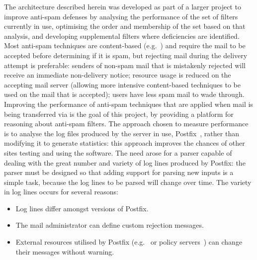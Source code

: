 \documentclass{svmult}
\begin{document}
The architecture described herein was developed as part of a larger project
to improve anti-spam defenses by analysing the performance of the set of
filters currently in use, optimising the order and membership of the set
based on that analysis, and developing supplemental filters where
deficiencies are identified.  Most anti-spam techniques are content-based
(e.g.~\cite{a-plan-for-spam, word-stemming, relaxed-online-svms}) and
require the mail to be accepted before determining if it is spam, but
rejecting mail during the delivery attempt is preferable: senders of
non-spam mail that is mistakenly rejected will receive an immediate
non-delivery notice; resource usage is reduced on the accepting mail server
(allowing more intensive content-based techniques to be used on the mail
that is accepted); users have less spam mail to wade through.  Improving
the performance of anti-spam techniques that are applied when mail is being
transferred via \SMTP{}\footnotemark{} is the goal of this project, by
providing a platform for reasoning about anti-spam filters.  The approach
chosen to measure performance is to analyse the log files produced by the
\SMTP{} server in use, Postfix~\cite{postfix}, rather than modifying it to
generate statistics: this approach improves the chances of other sites
testing and using the software.  The need arose for a parser capable of
dealing with the great number and variety of log lines produced by Postfix:
the parser must be designed so that adding support for parsing new inputs
is a simple task, because the log lines to be parsed will change over time.
The variety in log lines occurs for several reasons:

\begin{itemize}

    \item Log lines differ amongst versions of Postfix.
        
    \item The mail administrator can define custom rejection messages.

    \item External resources utilised by Postfix (e.g.\ \DNSBL{} or policy
        servers~\cite{policy-servers}) can change their messages without
        warning.

\end{itemize}
\end{document}
